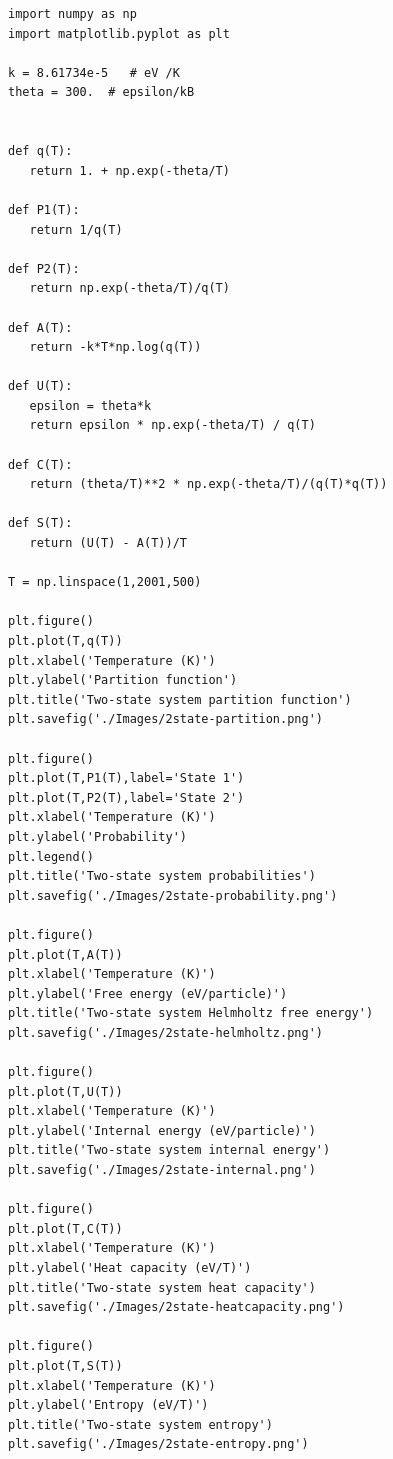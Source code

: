 \documentclass[11pt]{article}
\begin{document}
\begin{verbatim}
import numpy as np
import matplotlib.pyplot as plt

k = 8.61734e-5   # eV /K
theta = 300.  # epsilon/kB


def q(T):
   return 1. + np.exp(-theta/T)

def P1(T):
   return 1/q(T)

def P2(T):
   return np.exp(-theta/T)/q(T)

def A(T):
   return -k*T*np.log(q(T))

def U(T):
   epsilon = theta*k
   return epsilon * np.exp(-theta/T) / q(T)

def C(T):
   return (theta/T)**2 * np.exp(-theta/T)/(q(T)*q(T))

def S(T):
   return (U(T) - A(T))/T

T = np.linspace(1,2001,500)

plt.figure()
plt.plot(T,q(T))
plt.xlabel('Temperature (K)')
plt.ylabel('Partition function')
plt.title('Two-state system partition function')
plt.savefig('./Images/2state-partition.png')

plt.figure()
plt.plot(T,P1(T),label='State 1')
plt.plot(T,P2(T),label='State 2')
plt.xlabel('Temperature (K)')
plt.ylabel('Probability')
plt.legend()
plt.title('Two-state system probabilities')
plt.savefig('./Images/2state-probability.png')

plt.figure()
plt.plot(T,A(T))
plt.xlabel('Temperature (K)')
plt.ylabel('Free energy (eV/particle)')
plt.title('Two-state system Helmholtz free energy')
plt.savefig('./Images/2state-helmholtz.png')

plt.figure()
plt.plot(T,U(T))
plt.xlabel('Temperature (K)')
plt.ylabel('Internal energy (eV/particle)')
plt.title('Two-state system internal energy')
plt.savefig('./Images/2state-internal.png')

plt.figure()
plt.plot(T,C(T))
plt.xlabel('Temperature (K)')
plt.ylabel('Heat capacity (eV/T)')
plt.title('Two-state system heat capacity')
plt.savefig('./Images/2state-heatcapacity.png')

plt.figure()
plt.plot(T,S(T))
plt.xlabel('Temperature (K)')
plt.ylabel('Entropy (eV/T)')
plt.title('Two-state system entropy')
plt.savefig('./Images/2state-entropy.png')


\end{verbatim}
\end{document}

